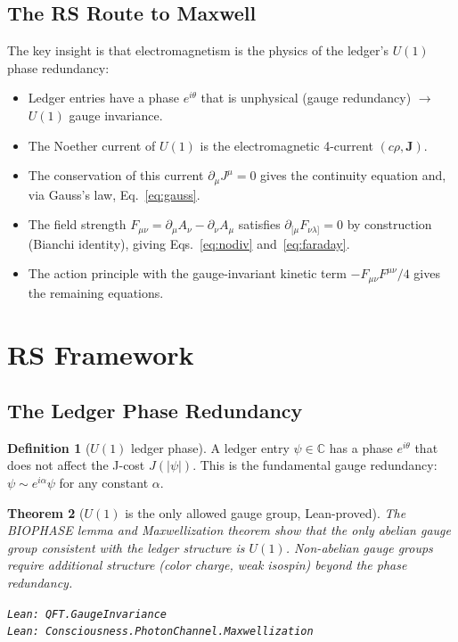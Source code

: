 \documentclass[12pt,a4paper]{article}
\newtheorem{theorem}{Theorem}[section]
\theoremstyle{definition}
\newtheorem{definition}[theorem]{Definition}
\theoremstyle{remark}
\begin{document}
\subsection{The RS Route to Maxwell}

The key insight is that electromagnetism is the physics of the ledger's
$U(1)$ phase redundancy:
\begin{itemize}
  \item Ledger entries have a phase $e^{i\theta}$ that is unphysical
        (gauge redundancy) $\to$ $U(1)$ gauge invariance.
  \item The Noether current of $U(1)$ is the electromagnetic 4-current
        $(c\rho, \mathbf{J})$.
  \item The conservation of this current $\partial_\mu J^\mu = 0$ gives
        the continuity equation and, via Gauss's law, Eq.~\eqref{eq:gauss}.
  \item The field strength $F_{\mu\nu} = \partial_\mu A_\nu - \partial_\nu A_\mu$
        satisfies $\partial_{[\mu} F_{\nu\lambda]} = 0$ by construction
        (Bianchi identity), giving Eqs.~\eqref{eq:nodiv}
        and~\eqref{eq:faraday}.
  \item The action principle with the gauge-invariant kinetic term
        $-F_{\mu\nu}F^{\mu\nu}/4$ gives the remaining equations.
\end{itemize}

\section{RS Framework}

\subsection{The Ledger Phase Redundancy}

\begin{definition}[$U(1)$ ledger phase]
A ledger entry $\psi \in \mathbb{C}$ has a phase $e^{i\theta}$ that
does not affect the J-cost $J(|\psi|)$.  This is the fundamental
gauge redundancy: $\psi \sim e^{i\alpha}\psi$ for any constant $\alpha$.
\end{definition}

\begin{theorem}[$U(1)$ is the only allowed gauge group, Lean-proved]
\label{thm:u1}
The BIOPHASE lemma and Maxwellization theorem show that the only
abelian gauge group consistent with the ledger structure is $U(1)$.
Non-abelian gauge groups require additional structure (color charge,
weak isospin) beyond the phase redundancy.

\texttt{Lean: QFT.GaugeInvariance}\\
\texttt{Lean: Consciousness.PhotonChannel.Maxwellization}
\end{theorem}
\end{document}
